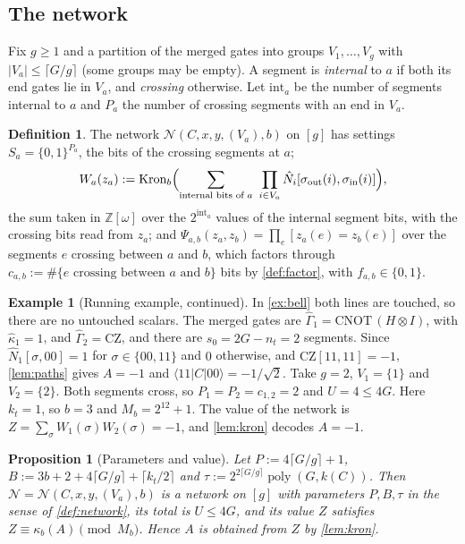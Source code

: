 \documentclass[10pt]{amsart}
\theoremstyle{plain}
\newtheorem{proposition}[theorem]{Proposition}
\theoremstyle{definition}
\newtheorem{definition}[theorem]{Definition}
\newtheorem{example}{Example}
\theoremstyle{remark}
\numberwithin{equation}{section}
\newcommand{\Z}{\mathbb{Z}}
\newcommand{\Zw}{\Z[\omega]}
\newcommand{\poly}{\operatorname{poly}}
\newcommand{\Kron}{\operatorname{Kron}}
\newcommand{\amp}[3]{\langle #1|#2|#3\rangle}
\begin{document}
\subsection{The network}\label{sec:network}
Fix $g\ge1$ and a partition of the merged gates into groups $V_1,\dots,V_g$ with
$|V_a|\le\lceil G/g\rceil$ (some groups may be empty). A segment is \emph{internal} to $a$ if both
its end gates lie in $V_a$, and \emph{crossing} otherwise. Let $\mathrm{int}_a$ be the number of
segments internal to $a$ and $P_a$ the number of crossing segments with an end in $V_a$.

\begin{definition}\label{def:qnet}
The network $\mathcal N(C,x,y,(V_a),b)$ on $[g]$ has settings $S_a=\{0,1\}^{P_a}$, the bits of the
crossing segments at $a$;
\[
 W_a(z_a):=\Kron_b\Bigl(\sum_{\text{internal bits of }a}\ \prod_{i\in V_a}\hat N_i[\sigma_{\mathrm{out}}(i),\sigma_{\mathrm{in}}(i)]\Bigr),
\]
the sum taken in $\Zw$ over the $2^{\mathrm{int}_a}$ values of the internal segment bits, with the
crossing bits read from $z_a$; and
$\Psi_{a,b}(z_a,z_b)=\prod_{e}[z_a(e)=z_b(e)]$ over the segments $e$ crossing between $a$ and $b$,
which factors through $c_{a,b}:=\#\{e\text{ crossing between }a\text{ and }b\}$ bits by
\cref{def:factor}, with $f_{a,b}\in\{0,1\}$.
\end{definition}

\begin{example}[Running example, continued]\label{ex:bell-net}
In \cref{ex:bell} both lines are touched, so there are no untouched scalars. The merged gates are
$\hat\Gamma_1=\mathrm{CNOT}\,(H\otimes I)$, with $\hat\kappa_1=1$, and $\hat\Gamma_2=\mathrm{CZ}$, and
there are $s_0=2G-n_t=2$ segments. Since $\hat N_1[\sigma,00]=1$ for $\sigma\in\{00,11\}$ and $0$
otherwise, and $\mathrm{CZ}[11,11]=-1$, \cref{lem:paths} gives $A=-1$ and $\amp{11}{C}{00}=-1/\sqrt2$.
Take $g=2$, $V_1=\{1\}$ and $V_2=\{2\}$. Both segments cross, so $P_1=P_2=c_{1,2}=2$ and
$U=4\le4G$. Here $k_t=1$, so $b=3$ and $M_b=2^{12}+1$. The value of the network is
$Z=\sum_{\sigma}W_1(\sigma)W_2(\sigma)=-1$, and \cref{lem:kron} decodes $A=-1$.
\end{example}

\begin{proposition}[Parameters and value]\label{prop:params}
Let $P:=4\lceil G/g\rceil+1$, $B:=3b+2+4\lceil G/g\rceil+\lceil k_t/2\rceil$ and
$\tau:=2^{2\lceil G/g\rceil}\poly(G,k(C))$. Then $\mathcal N=\mathcal N(C,x,y,(V_a),b)$ is a
network on $[g]$ with parameters $P,B,\tau$ in the sense of \cref{def:network}, its total is
$U\le 4G$, and its value $Z$ satisfies $Z\equiv\kappa_b(A)\pmod{M_b}$. Hence $A$ is obtained from
$Z$ by \cref{lem:kron}.
\end{proposition}
\end{document}
